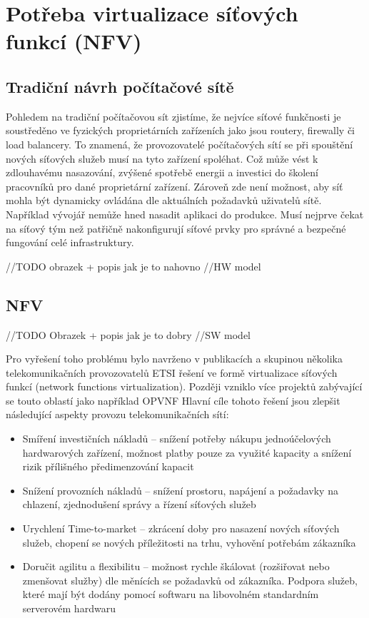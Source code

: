 \section{Potřeba virtualizace síťových funkcí (NFV)}

\subsection{Tradiční návrh počítačové sítě}

Pohledem na tradiční počítačovou sít zjistíme, že nejvíce síťové funkčnosti je soustředěno ve fyzických proprietárních zařízeních jako jsou routery, firewally či load balancery. To znamená, že provozovatelé počítačových sítí se při spouštění nových síťových služeb musí na tyto zařízení spoléhat. Což může vést k zdlouhavému nasazování, zvýšené spotřebě energii a investici do školení pracovníků pro dané proprietární zařízení. Zároveň zde není možnost, aby síť mohla být dynamicky ovládána dle aktuálních požadavků uživatelů sítě. Například vývojář nemůže hned nasadit aplikaci do produkce. Musí nejprve čekat na síťový tým než patřičně nakonfigurují síťové prvky pro správné a bezpečné fungování celé infrastruktury.

//TODO obrazek + popis jak je to nahovno
//HW model 

\subsection{NFV}

//TODO Obrazek + popis jak je to dobry
//SW model


Pro vyřešení toho problému bylo navrženo v publikacích \cite{NFV_paper2012} a \cite{NFV_paper2013} skupinou několika telekomunikačních provozovatelů ETSI řešení ve formě virtualizace síťových funkcí (network functions virtualization). Později vzniklo více projektů zabývající se touto oblastí jako například OPVNF \cite{OPNFV}  Hlavní cíle tohoto řešení jsou zlepšit následující aspekty provozu telekomunikačních sítí:

\begin{itemize}
\item Smíření investičních nákladů – snížení potřeby nákupu jednoúčelových hardwarových zařízení, možnost platby pouze za využité kapacity a snížení rizik přílišného předimenzování kapacit
\item Snížení provozních nákladů – snížení prostoru, napájení a požadavky na chlazení, zjednodušení správy a řízení síťových služeb
\item Urychlení Time-to-market – zkrácení doby pro nasazení nových síťových služeb, chopení se nových příležitosti na trhu, vyhovění potřebám zákazníka
\item Doručit agilitu a flexibilitu – možnost rychle škálovat (rozšiřovat nebo zmenšovat služby) dle měnících se požadavků od zákazníka. Podpora služeb, které mají být dodány pomocí softwaru na libovolném standardním serverovém hardwaru
\end{itemize}

